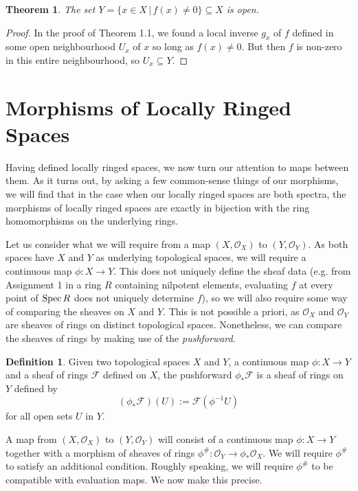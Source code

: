 \documentclass[a4,12pt]{article}
\theoremstyle{definition}
\newtheorem{definition}{Definition}[section]
\theoremstyle{remark}
\theoremstyle{plain}
\newtheorem{theorem}{Theorem}[section]
\numberwithin{equation}{section}
\newcommand{\Spec}{\textnormal{Spec}\,}
\newcommand{\2}[4]{\begin{bmatrix}#1 & #2 \\ #3 & #4 \end{bmatrix}} %
\newcommand{\3}[9]{\begin{bmatrix}#1 & #2 & #3 \\ #4 & #5 & #6 \\ #7 & #8 & #9 \end{bmatrix}} %
\begin{document}
\begin{theorem}
The set $Y = \{x \in X \, | \, f(x) \ne 0\} \subseteq X$ is open.
\end{theorem}

\begin{proof}
In the proof of Theorem 1.1, we found a local inverse $g_x$ of $f$ defined in some open neighbourhood $U_x$ of $x$ so long as $f(x) \ne 0$. But then $f$ is non-zero in this entire neighbourhood, so $U_x \subseteq Y$.
\end{proof}

\section{Morphisms of Locally Ringed Spaces}

Having defined locally ringed spaces, we now turn our attention to maps between them. As it turns out, by asking a few common-sense things of our morphisms, we will find that in the case when our locally ringed spaces are both spectra, the morphisms of locally ringed spaces are exactly in bijection with the ring homomorphisms on the underlying rings.

Let us consider what we will require from a map $(X,\mathcal{O}_X)$ to $(Y,\mathcal{O}_Y)$.
As both spaces have $X$ and $Y$ as underlying topological spaces, we will require a continuous map $\phi : X \to Y$. This does not uniquely define the sheaf data (e.g. from Assignment 1 in a ring $R$ containing nilpotent elements, evaluating $f$ at every point of $\Spec R$ does not uniquely determine $f$), so we will also require some way of comparing the sheaves on $X$ and $Y$. This is not possible a priori, as $\mathcal{O}_X$ and $\mathcal{O}_Y$ are sheaves of rings on distinct topological spaces. Nonetheless, we can compare the sheaves of rings by making use of the \textit{pushforward}. 

\begin{definition}
Given two topological spaces $X$ and $Y$, a continuous map {$\phi : X \to Y$} and a sheaf of rings $\mathcal{F}$ defined on $X$, the pushforward $\phi_\ast\mathcal{F}$ is a sheaf of rings on $Y$ defined by
\begin{equation}
(\phi_\ast\mathcal{F})(U) 	:= 	\mathcal{F}(\phi^{-1}U)
\end{equation}
for all open sets $U$ in $Y$.
\end{definition}

A map from \((X, \mathcal{O}_X)\) to \((Y, \mathcal{O}_Y)\) will consist of a continuous map \(\phi \colon X \to Y\) together with a morphism of sheaves of rings $\phi^\# : \mathcal{O}_Y \to \phi_\ast\mathcal{O}_X$.
We will require \(\phi^{\#}\) to satisfy an additional condition.
Roughly speaking, we will require \(\phi^{\#}\) to be compatible with evaluation maps.
We now make this precise.
\end{document}
